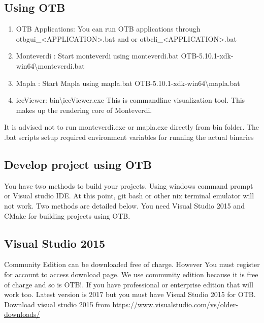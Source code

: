 \documentclass[10pt,a4paper]{article}
\begin{document}
\subsection{Using OTB}
\begin{enumerate}
\item OTB Applications: You can run OTB applications through otbgui\_<APPLICATION>.bat and or otbcli\_<APPLICATION>.bat
 
\item Monteverdi : Start monteverdi using monteverdi.bat OTB-5.10.1-xdk-win64{\textbackslash}monteverdi.bat
  
\item Mapla : Start Mapla using mapla.bat OTB-5.10.1-xdk-win64{\textbackslash}mapla.bat
  
\item iceViewer: bin{\textbackslash}iceViewer.exe This is commandline visualization tool. This makes up the rendering core of Monteverdi.
  
\end{enumerate}

It is advised not to run monteverdi.exe or mapla.exe directly from bin folder.
\newline
The .bat scripts setup required environment variables for running the actual binaries

\subsection{Develop project using OTB}

You have two methods to build your projects. Using windows command prompt or Visual studio IDE.
\newline
At this point, git bash or other nix terminal emulator will not work. Two methods are detailed below.
\newline
You need Visual Studio 2015 and CMake for building projects using OTB.

\subsection{Visual Studio 2015}
Community Edition can be downloaded free of charge. However You must register for account to access download page.
\newline
We use community edition because it is free of charge and so is OTB!. If you have professional or enterprise edition that will work too.
\newline
Latest version is 2017 but you must have  Visual Studio 2015 for OTB.
\newline
Download visual studio 2015 from \url{https://www.visualstudio.com/vs/older-downloads/}
\newline
\end{document}

